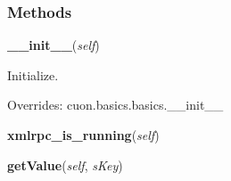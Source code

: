 
  \subsubsection{Methods}

    \vspace{0.5ex}

\hspace{.8\funcindent}\begin{boxedminipage}{\funcwidth}

    \raggedright \textbf{\_\_init\_\_}(\textit{self})

\setlength{\parskip}{2ex}
    Initialize.

\setlength{\parskip}{1ex}
      Overrides: cuon.basics.basics.\_\_init\_\_

    \end{boxedminipage}

    \label{cuon:Database:Database:xmlrpc_is_running}

    \vspace{0.5ex}

\hspace{.8\funcindent}\begin{boxedminipage}{\funcwidth}

    \raggedright \textbf{xmlrpc\_is\_running}(\textit{self})

\setlength{\parskip}{2ex}
\setlength{\parskip}{1ex}
    \end{boxedminipage}

    \label{cuon:Database:Database:getValue}

    \vspace{0.5ex}

\hspace{.8\funcindent}\begin{boxedminipage}{\funcwidth}

    \raggedright \textbf{getValue}(\textit{self}, \textit{sKey})

\setlength{\parskip}{2ex}
\setlength{\parskip}{1ex}
    \end{boxedminipage}


